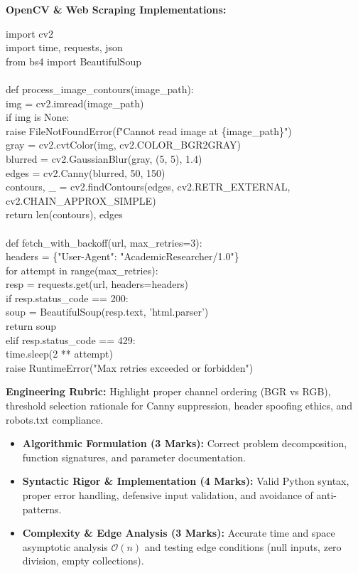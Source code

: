 \begin{solbox}
\textbf{OpenCV \& Web Scraping Implementations:}
\begin{pycode}
import cv2\\
import time, requests, json\\
from bs4 import BeautifulSoup\\
~\\
def process\_image\_contours(image\_path):\\
\quad img = cv2.imread(image\_path)\\
\quad if img is None:\\
\quad \quad raise FileNotFoundError(f"Cannot read image at \{image\_path\}")\\
\quad gray = cv2.cvtColor(img, cv2.COLOR\_BGR2GRAY)\\
\quad blurred = cv2.GaussianBlur(gray, (5, 5), 1.4)\\
\quad edges = cv2.Canny(blurred, 50, 150)\\
\quad contours, \_ = cv2.findContours(edges, cv2.RETR\_EXTERNAL, cv2.CHAIN\_APPROX\_SIMPLE)\\
\quad return len(contours), edges\\
~\\
def fetch\_with\_backoff(url, max\_retries=3):\\
\quad headers = \{"User-Agent": "AcademicResearcher/1.0"\}\\
\quad for attempt in range(max\_retries):\\
\quad \quad resp = requests.get(url, headers=headers)\\
\quad \quad if resp.status\_code == 200:\\
\quad \quad \quad soup = BeautifulSoup(resp.text, 'html.parser')\\
\quad \quad \quad return soup\\
\quad \quad elif resp.status\_code == 429:\\
\quad \quad \quad time.sleep(2 ** attempt)\\
\quad raise RuntimeError("Max retries exceeded or forbidden")
\end{pycode}
\textbf{Engineering Rubric:} Highlight proper channel ordering (BGR vs RGB), threshold selection rationale for Canny suppression, header spoofing ethics, and robots.txt compliance.
\end{solbox}

\begin{examinertip}
\begin{itemize}[leftmargin=1.5em, itemsep=2pt]
    \item \textbf{Algorithmic Formulation (3 Marks):} Correct problem decomposition, function signatures, and parameter documentation.
    \item \textbf{Syntactic Rigor \& Implementation (4 Marks):} Valid Python syntax, proper error handling, defensive input validation, and avoidance of anti-patterns.
    \item \textbf{Complexity \& Edge Analysis (3 Marks):} Accurate time and space asymptotic analysis $\mathcal{O}(n)$ and testing edge conditions (null inputs, zero division, empty collections).
\end{itemize}
\end{examinertip}
